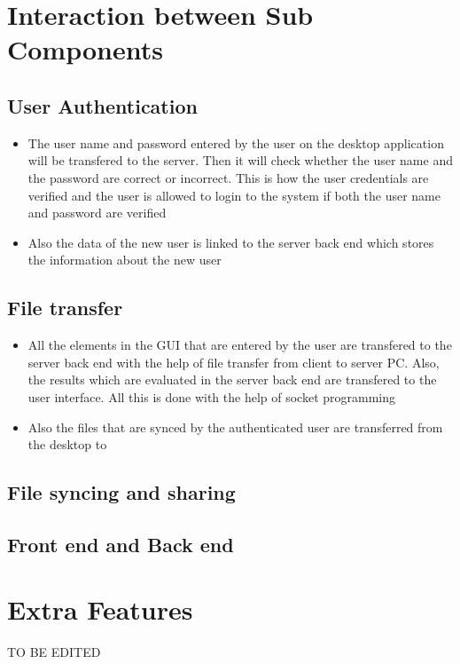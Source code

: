 \documentclass{article}
\begin{document}
	\section{Interaction between Sub Components}
		\subsection{User Authentication}
			\begin{itemize}
				\item The user name and password entered by the user on the desktop application will be transfered to the server. Then it will check whether the user name and the password are correct or incorrect. This is how the user credentials are verified and the user is allowed to login to the system if both the user name and password are verified
				\item Also the data of the new user is linked to the server back end which stores the information about the new user
			\end{itemize}
		\subsection{File transfer}
			\begin{itemize}
				\item All the elements in the GUI that are entered by the user are transfered to the server back end with the help of file transfer from client to server PC. Also, the results which are evaluated in the server back end are transfered to the user interface. All this is done with the help of socket programming

				\item Also the files that are synced by the authenticated user are transferred from the desktop to
			\end{itemize}
		\subsection{File syncing and sharing}
			\begin{itemize}
			\end{itemize}
		\subsection{Front end and Back end}
			\begin{itemize}
			\end{itemize}
	\section{Extra Features}
		TO BE EDITED
\end{document}
